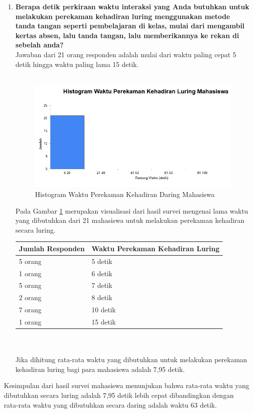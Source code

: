 \begin{enumerate}
	\item \textbf{Berapa detik perkiraan waktu interaksi yang Anda butuhkan untuk melakukan perekaman kehadiran luring menggunakan metode tanda tangan seperti pembelajaran di kelas, mulai dari mengambil kertas absen, lalu tanda tangan, lalu memberikannya ke rekan di sebelah anda?}\\
	Jawaban dari 21 orang responden adalah mulai dari waktu paling cepat 5 detik hingga waktu paling lama 15 detik.\\ \\
	\begin{figure}[H]
		\centering
		\includegraphics[scale=1]{Gambar/LuringMahasiswa.jpg}
		\caption{Histogram Waktu Perekaman Kehadiran Daring Mahasiswa} 
		\label{fig:LuringMahasiswa}
	\end{figure}
	Pada Gambar \ref{fig:LuringMahasiswa} merupakan visualisasi dari hasil survei mengenai lama waktu yang dibutuhkan dari 21 mahasiswa untuk melakukan perekaman kehadiran secara luring.\\
	  \begin{tabular}{|p{4cm} |p{7cm}|}
		\hline
		Jumlah Responden &  Waktu Perekaman Kehadiran Luring \\ \hline     
		5 orang &  5 detik\\ \hline 
		1 orang &  6 detik\\ \hline 
		5 orang &  7 detik\\ \hline 
		2 orang &  8 detik\\ \hline 
		7 orang &  10 detik\\ \hline 
		1 orang &  15 detik\\ \hline
	\end{tabular}\\ \\
	Jika dihitung rata-rata waktu yang dibutuhkan untuk melakukan perekaman kehadiran luring bagi para mahasiswa adalah 7,95 detik.
\end{enumerate}
Kesimpulan dari hasil survei mahasiswa menunjukan bahwa rata-rata waktu yang dibutuhkan secara luring adalah 7,95 detik lebih cepat dibandingkan dengan rata-rata waktu yang dibutuhkan secara daring adalah waktu 63 detik.

